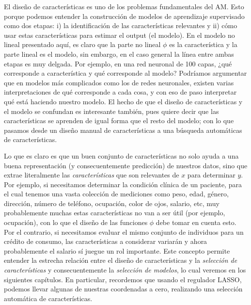 \fi

\begin{mdframed}[style=discusion, frametitle={\center Discusión}]
El diseño de características es uno de los problemas fundamentales del AM. Esto porque podemos entender la construcción de modelos de aprendizaje supervisado como dos etapas: i) la identificación de las características relevantes y ii) cómo usar estas características para estimar el output (el modelo). En el modelo no lineal presentado aquí, es claro que la parte no lineal $\phi$ es la característica y la parte lineal es el modelo, sin embargo, en el caso general la línea entre ambas etapas es muy delgada.  Por ejemplo, en una red neuronal de 100 capas, ¿qué corresponde a característica y qué corresponde al modelo? Podríamos argumentar que en modelos más complicados como los de redes neuronales, existen varias interpretaciones de qué corresponde a cada cosa, y con eso de paso interpretar qué está haciendo nuestro modelo. El hecho de que el diseño de características y el modelo se confundan es interesante también, pues quiere decir que las características se aprenden de igual forma que el resto del modelo; con lo que pasamos desde un diseño manual de características a una búsqueda automáticas de características. 

Lo que es claro es que un buen conjunto de características no solo ayuda a una buena representación (y consecuentemente predicción) de nuestros datos, sino que extrae literalmente las  \emph{características} que son relevantes de $x$ para determinar $y$. Por ejemplo, si necesitamos determinar la condición clínica de un  paciente, para el cual tenemos una vasta colección de  mediciones como peso, edad, género, dirección, número de teléfono, ocupación, color de ojos, salario, etc, muy probablemente muchas estas características no van a ser útil (por ejemplo, ocupación), con lo que el diseño de las funciones $\phi$ debe tomar en cuenta esto. Por el contrario, si necesitamos evaluar el mismo conjunto de individuos  para un crédito de consumo, las características a considerar variarán y ahora probablemente el salario sí juegue un rol importante. Este concepto permite entender la estrecha relación entre el diseño de características y la \emph{selección de características} y consecuentemente la \emph{selección de modelos}, lo cual veremos en los siguientes capítulos. En particular, recordemos que usando el regulador LASSO, podemos llevar algunas de nuestras coordenadas a cero, realizando una selección automática de características. 

\end{mdframed}

